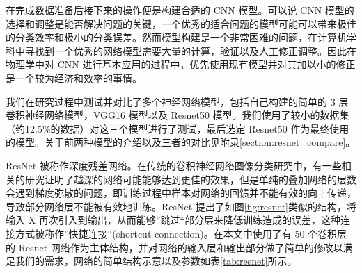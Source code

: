 在完成数据准备后接下来的操作便是构建合适的 CNN 模型。可以说 CNN 模型的选择和调整是能否解决问题的关键，一个优秀的适合问题的模型可能可以带来极佳的分类效率和极小的分类误差。然而模型构建是一个非常困难的问题，在计算机学科中寻找到一个优秀的网络模型需要大量的计算，验证以及人工修正调整。因此在物理学中对 CNN 进行基本应用的过程中，优先使用现有模型并对其加以小的修正是一个较为经济和效率的事情。

我们在研究过程中测试并对比了多个神经网络模型，包括自己构建的简单的 3 层卷积神经网络模型，VGG16 模型\supercite{simonyan2014very}以及 Resnet50 模型\supercite{he2016deep}。我们使用了较小的数据集（约12.5\%的数据）对这三个模型进行了测试，最后选定 Resnet50 作为最终使用的模型。关于前两种模型的介绍以及三者的对比见附录\ref{section:resnet_compare}。

ResNet 被称作深度残差网络。在传统的卷积神经网络图像分类研究中，有一些相关的研究证明了越深的网络可能能够达到更佳的效果，但是单纯的叠加网络的层数会遇到梯度弥散的问题，即训练过程中样本对网络的回馈并不能有效的向上传递，导致部分网络层不能被有效地训练。ResNet 提出了如图\ref{fig:resnet}类似的结构，将输入 X 再次引入到输出，从而能够”跳过“部分层来降低训练造成的误差，这种连接方式被称作”快捷连接“(shortcut connection)。在本文中使用了有 50 个卷积层的 Resnet 网络作为主体结构，并对网络的输入层和输出部分做了简单的修改以满足我们的需求，网络的简单结构示意以及参数如表\ref{tab:resnet}所示。

